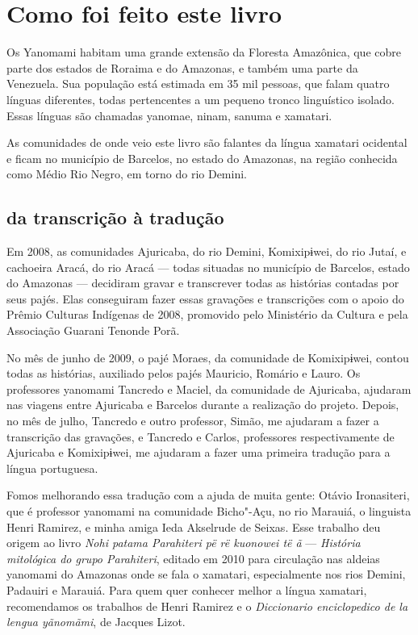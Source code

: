 \chapter{Como foi feito este livro}


\noindent{}Os Yanomami habitam uma grande extensão da Floresta Amazônica, que cobre
parte dos estados de Roraima e do Amazonas, e também uma parte da
Venezuela. Sua população está estimada em 35 mil pessoas, que falam
quatro línguas diferentes, todas pertencentes a um pequeno tronco
linguístico isolado. Essas línguas são chamadas yanomae, ninam, sanuma e
xamatari.

As comunidades de onde veio este livro são falantes da língua xamatari
ocidental e ficam no município de Barcelos, no estado do Amazonas, na
região conhecida como Médio Rio Negro, em torno do rio Demini.

\section{da transcrição à tradução}

Em 2008, as comunidades Ajuricaba, do rio Demini, Komixipɨwei, do rio
Jutaí, e cachoeira Aracá, do rio Aracá --- todas situadas no município
de Barcelos, estado do Amazonas --- decidiram gravar e transcrever todas
as histórias contadas por seus pajés. Elas conseguiram fazer essas
gravações e transcrições com o apoio do Prêmio Culturas Indígenas de
2008, promovido pelo Ministério da Cultura e pela Associação Guarani
Tenonde Porã.

No mês de junho de 2009, o pajé Moraes, da comunidade de Komixipɨwei,
contou todas as histórias, auxiliado pelos pajés Mauricio, Romário e
Lauro. Os professores yanomami Tancredo e Maciel, da comunidade de
Ajuricaba, ajudaram nas viagens entre Ajuricaba e Barcelos durante a
realização do projeto. Depois, no mês de julho, Tancredo e outro
professor, Simão, me ajudaram a fazer a transcrição das gravações, e
Tancredo e Carlos, professores respectivamente de Ajuricaba e
Komixipɨwei, me ajudaram a fazer uma primeira tradução para a língua
portuguesa.

Fomos melhorando essa tradução com a ajuda de muita gente: Otávio
Ironasiteri, que é professor yanomami na comunidade Bicho"-Açu, no rio
Marauiá, o linguista Henri Ramirez, e minha amiga Ieda Akselrude de
Seixas. Esse trabalho deu origem ao livro \textit{Nohi patama Parahiteri
pë rë kuonowei të ã} --- \textit{História mitológica do grupo Parahiteri},
editado em 2010 para circulação nas aldeias yanomami do Amazonas onde se
fala o xamatari, especialmente nos rios Demini, Padauiri e Marauiá. Para quem quer conhecer melhor a língua xamatari, recomendamos os trabalhos de Henri Ramirez e o \textit{Diccionario enciclopedico de la lengua yãnomãmi}, de Jacques Lizot.  

